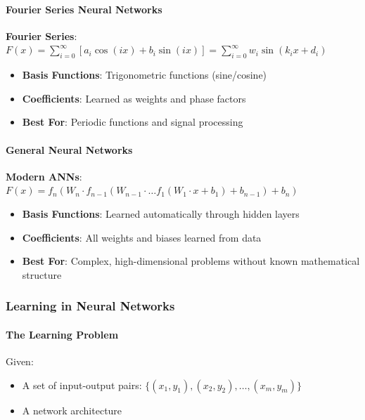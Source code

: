 \paragraph{Fourier Series Neural Networks}

\textbf{Fourier Series}: $F(x) = \sum_{i=0}^{\infty} \left[a_i \cos(ix) + b_i \sin(ix)\right] = \sum_{i=0}^{\infty} w_i \sin(k_i x + d_i)$

\begin{itemize}
\item \textbf{Basis Functions}: Trigonometric functions (sine/cosine)
\item \textbf{Coefficients}: Learned as weights and phase factors
\item \textbf{Best For}: Periodic functions and signal processing
\end{itemize}

\paragraph{General Neural Networks}

\textbf{Modern ANNs}: $F(x) = f_n\left(W_n \cdot f_{n-1}\left(W_{n-1} \cdot \ldots f_1(W_1 \cdot x + b_1) + b_{n-1}\right) + b_n\right)$

\begin{itemize}
\item \textbf{Basis Functions}: Learned automatically through hidden layers
\item \textbf{Coefficients}: All weights and biases learned from data
\item \textbf{Best For}: Complex, high-dimensional problems without known mathematical structure
\end{itemize}

\subsubsection{Learning in Neural Networks}

\paragraph{The Learning Problem}

Given:

\begin{itemize}
\item A set of input-output pairs: $\{(x_1, y_1), (x_2, y_2), \ldots, (x_m, y_m)\}$
\item A network architecture
\end{itemize}

